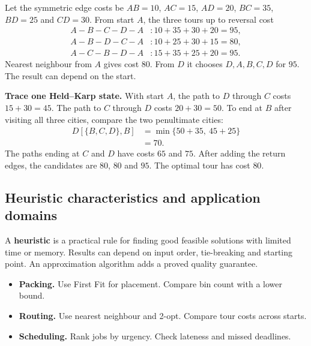 \documentclass[12pt,a4paper]{article}
\begin{document}
\begin{tcolorbox}[examplebox, title={Four-city TSP and a greedy counterexample}]
Let the symmetric edge costs be $AB=10$, $AC=15$, $AD=20$, $BC=35$, $BD=25$ and $CD=30$. From start $A$, the three tours up to reversal cost
\begin{align*}
A\!-\!B\!-\!C\!-\!D\!-\!A &: 10+35+30+20=95,\\
A\!-\!B\!-\!D\!-\!C\!-\!A &: 10+25+30+15=80,\\
A\!-\!C\!-\!B\!-\!D\!-\!A &: 15+35+25+20=95.
\end{align*}
Nearest neighbour from $A$ gives cost $80$. From $D$ it chooses $D,A,B,C,D$ for $95$. The result can depend on the start.
\par
\textbf{Trace one Held--Karp state.} With start $A$, the path to $D$ through $C$ costs $15+30=45$. The path to $C$ through $D$ costs $20+30=50$. To end at $B$ after visiting all three cities, compare the two penultimate cities:
\[
\begin{aligned}
D[\{B,C,D\},B]&=\min\{50+35,\ 45+25\}\\
               &=70.
\end{aligned}
\]
The paths ending at $C$ and $D$ have costs $65$ and $75$. After adding the return edges, the candidates are $80$, $80$ and $95$. The optimal tour has cost $80$.
\end{tcolorbox}

\subsection{Heuristic characteristics and application domains}
\begin{tcolorbox}[defbox, title={Heuristic}]
A \textbf{heuristic} is a practical rule for finding good feasible solutions with limited time or memory. Results can depend on input order, tie-breaking and starting point. An approximation algorithm adds a proved quality guarantee.
\begin{itemize}[leftmargin=*, itemsep=1pt, topsep=2pt]
  \item \textbf{Packing.} Use First Fit for placement. Compare bin count with a lower bound.
  \item \textbf{Routing.} Use nearest neighbour and 2-opt. Compare tour costs across starts.
  \item \textbf{Scheduling.} Rank jobs by urgency. Check lateness and missed deadlines.
\end{itemize}
\end{tcolorbox}
\end{document}
